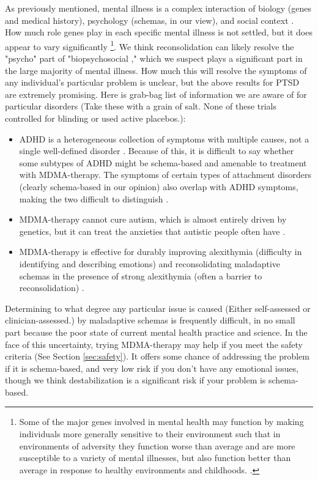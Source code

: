 \documentclass[12pt,letterpaper]{book}
\begin{document}
As previously mentioned, mental illness is a complex interaction of biology (genes and medical history), psychology (schemas, in our view), and social context \cite{engel1977need}. How much role genes play in each specific mental illness is not settled, but it does appear to vary significantly \cite{assary2018gene} \footnote{Some of the major genes involved in mental health may function by making individuals more generally sensitive to their environment such that in environments of adversity they function worse than average and are more susceptible to a variety of mental illnesses, but also function better than average in response to healthy environments and childhoods. \cite{assary2018gene}.}. We think reconsolidation can likely resolve the "psycho" part of "biopsychosocial \cite{carhart2019rebus,eckerUnlocking}," which we suspect plays a significant part in the large majority of mental illness. How much this will resolve the symptoms of any individual's particular problem is unclear, but the above results for PTSD are extremely promising. Here is grab-bag list of information we are aware of for particular disorders (Take these with a grain of salt. None of these trials controlled for blinding or used active placebos.):
\begin{itemize}
	\item ADHD is a heterogeneous collection of symptoms with multiple causes, not a single well-defined disorder \cite{luoADHDcauses}. Because of this, it is difficult to say whether some subtypes of ADHD might be schema-based and amenable to treatment with MDMA-therapy. The symptoms of certain types of attachment disorders (clearly schema-based in our opinion) also overlap with ADHD symptoms, making the two difficult to distinguish \cite{follan2011discrimination}.
	\item MDMA-therapy cannot cure autism, which is almost entirely driven by genetics, but it can treat the anxieties that autistic people often have \cite{taylorAutismEtiology,danforth2018autismMDMA}.
	\item MDMA-therapy is effective for durably improving alexithymia (difficulty in identifying and describing emotions) and reconsolidating maladaptive schemas in the presence of strong alexithymia (often a barrier to reconsolidation) \cite{vanSelfExperience}.
\end{itemize}
Determining to what degree any particular issue is caused (Either self-assessed or clinician-assessed.) by maladaptive schemas is frequently difficult, in no small part because the poor state of current mental health practice and science. In the face of this uncertainty, trying MDMA-therapy may help if you meet the safety criteria (See Section \ref{sec:safety}). It offers some chance of addressing the problem if it is schema-based, and very low risk if you don't have any emotional issues, though we think destabilization is a significant risk if your problem is schema-based.
\end{document}
